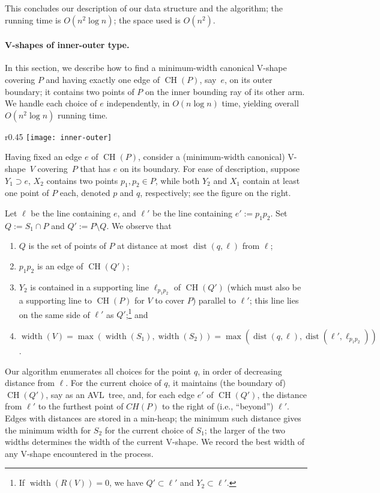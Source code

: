 \documentclass{llncs}
\DeclareMathOperator{\conv}{CH}
\DeclareMathOperator{\dist}{dist}
\DeclareMathOperator{\width}{width}
\begin{document}
This concludes our description of our data structure and the
algorithm; the running time is $O(n^2\log n)$; the space used is
$O(n^2)$.
\fi

\paragraph{V-shapes of inner-outer type.}




In this section, we describe how to find a minimum-width canonical
V-shape covering $P$ and having exactly one edge of $\conv(P)$, say~$e$,
on its outer boundary; it
contains two points of $P$ on the inner bounding ray of its other arm.
We handle each choice of $e$ independently, in $O(n \log n)$ time,
yielding overall $O(n^2\log n)$ running time.

\begin{wrapfigure}[15]{r}{0.45\textwidth}
 \texttt{[image: inner-outer]}
\end{wrapfigure}

Having fixed an edge $e$ of $\conv(P)$, consider a (minimum-width
canonical) V-shape~$V$ covering~$P$ that has $e$ on its boundary. For
ease of description, suppose $Y_1 \supset e$, $X_2$ contains two
points $p_1,p_2 \in P$, while both $Y_2$ and $X_1$ contain at least one point
of $P$ each, denoted $p$ and $q$, respectively; see the figure on the right.


Let $\ell$ be the line containing $e$, and $\ell'$ be the line
containing $e':=p_1p_2$.  Set $Q:=S_1\cap P$ and $Q':=P\setminus Q$.  We
observe that
\begin{enumerate} \itemsep 0pt \parsep 0pt \parskip 0pt
\item $Q$ is the set of points of $P$ at distance at most
  $\dist(q,\ell)$ from $\ell$;
\item $p_1p_2$ is an edge of $\conv(Q')$;
\item $Y_2$ is contained in a supporting line $\ell_{p_1p_2}$ of
  $\conv(Q')$ (which must also be a supporting line to $\conv(P)$ for 
  $V$ to cover $P$) parallel to $\ell'$; this line lies on
  the same side of $\ell'$ as $Q'$;\footnote{If $\width(R(V))=0$, we have $Q' \subset \ell'$ and $Y_2 \subset
    \ell'$.}
   and
\item $\width(V)=\max(\width(S_1),\width(S_2))=
  \max(\dist(q,\ell),\dist(\ell' ,\ell_{p_1p_2}))$.
\end{enumerate}
Our algorithm enumerates all choices for the point $q$, in order of
decreasing distance from $\ell$. 
  For the current choice of $q$, it
maintains (the boundary of)
$\conv(Q')$, say as an AVL~tree, and, for each edge $e'$ of
$\conv(Q')$, 
the distance from $\ell'$ to the furthest point of $CH(P)$ to the
right of (i.e., ``beyond'') $\ell'$.
Edges with distances are
stored in a min-heap; the minimum such distance gives the minimum
width for $S_2$ for the current choice of $S_1$; the larger of the two widths
determines the width of the current V-shape.  We record the best width
of any V-shape encountered in the process.
\end{document}
